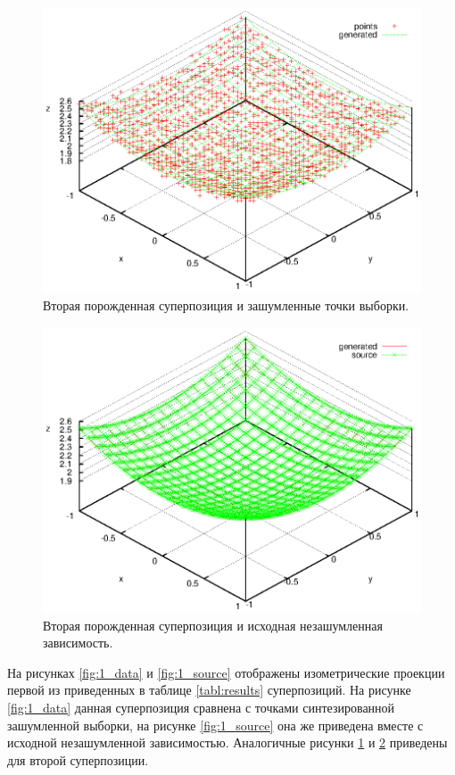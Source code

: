 \documentclass[12pt,a4paper]{article}
\begin{document}
\begin{figure}[h]
  \centering
  \includegraphics[scale=1.1]{figs/2-data.eps}
  \caption{Вторая порожденная суперпозиция и зашумленные точки выборки.}
  \label{fig:2_data}
\end{figure}

\begin{figure}[h]
  \centering
  \includegraphics[scale=1.1]{figs/2-source.eps}
  \caption{Вторая порожденная суперпозиция и исходная незашумленная зависимость.}
  \label{fig:2_source}
\end{figure}

На рисунках \ref{fig:1_data} и \ref{fig:1_source} отображены изометрические
проекции первой из приведенных в таблице \ref{tabl:results} суперпозиций. На
рисунке \ref{fig:1_data} данная суперпозиция сравнена с точками синтезированной
зашумленной выборки, на рисунке \ref{fig:1_source} она же приведена вместе
с исходной незашумленной зависимостью. Аналогичные рисунки \ref{fig:2_data}
и \ref{fig:2_source} приведены для второй суперпозиции.
\end{document}
